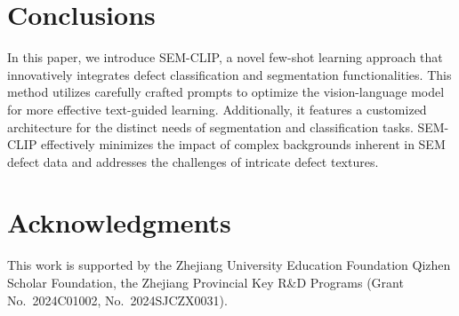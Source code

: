 
\section{Conclusions}
\label{sec:conclusions}


In this paper, we introduce SEM-CLIP, a novel few-shot learning approach that innovatively integrates defect classification and segmentation functionalities.
This method utilizes carefully crafted prompts to optimize the vision-language model for more effective text-guided learning.
Additionally, it features a customized architecture for the distinct needs of segmentation and classification tasks. SEM-CLIP effectively minimizes the impact of complex backgrounds inherent in SEM defect data and addresses the challenges of intricate defect textures.

\section*{Acknowledgments}
This work is supported by the Zhejiang University Education Foundation Qizhen Scholar Foundation, the Zhejiang Provincial Key R\&D Programs (Grant No.~2024C01002, No.~2024SJCZX0031).